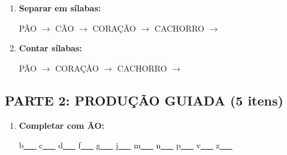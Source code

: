 \begin{exercicio}
\begin{enumerate}
  \item \textbf{Separar em sílabas:}
  \begin{center}
  PÃO $\rightarrow$ \underline{\hspace{1cm}} \quad CÃO $\rightarrow$ \underline{\hspace{1cm}} \quad CORAÇÃO $\rightarrow$ \underline{\hspace{1cm}} \underline{\hspace{1cm}} \underline{\hspace{1cm}} \quad CACHORRO $\rightarrow$ \underline{\hspace{1cm}} \underline{\hspace{1cm}} \underline{\hspace{1cm}}
  \end{center}

  \item \textbf{Contar sílabas:}
  \begin{center}
  PÃO $\rightarrow$ \underline{\hspace{1cm}} \quad CORAÇÃO $\rightarrow$ \underline{\hspace{1cm}} \quad CACHORRO $\rightarrow$ \underline{\hspace{1cm}}
  \end{center}
\end{enumerate}

\subsection*{PARTE 2: PRODUÇÃO GUIADA (5 itens)}

\begin{enumerate}[resume]
  \item \textbf{Completar com ÃO:}
  \begin{center}
  b\underline{~~~} \quad c\underline{~~~} \quad d\underline{~~~} \quad f\underline{~~~} \quad g\underline{~~~} \quad j\underline{~~~} \quad m\underline{~~~} \quad n\underline{~~~} \quad p\underline{~~~} \quad v\underline{~~~} \quad z\underline{~~~}
  \end{center}


\end{enumerate}
\end{exercicio}
